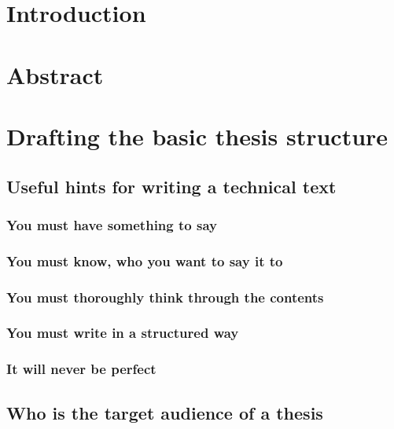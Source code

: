 
\chapter{Introduction}

\chapter{Abstract}
\label{abstrakt}

\chapter{Drafting the basic thesis structure}
\label{struktura}

\section{Useful hints for writing a technical text}

\subsection*{You must have something to say}

\subsection*{You must know, who you want to say it to}

\subsection*{You must thoroughly think through the contents}

\subsection*{You must write in a structured way}

\subsection*{It will never be perfect}

\section{Who is the target audience of a thesis}

